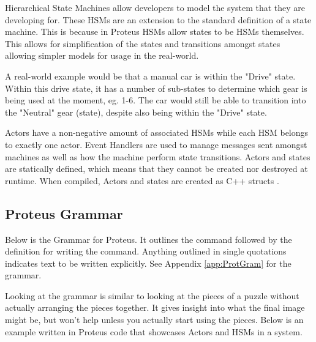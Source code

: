 Hierarchical State Machines allow developers to model the system that they are developing for.
These HSMs are an extension to the standard definition of a state machine.
This is because in Proteus HSMs allow states to be HSMs themselves.
This allows for simplification of the states and transitions amongst states allowing simpler models for usage in the real-world.

A real-world example would be that a manual car is within the "Drive" state.
Within this drive state, it has a number of sub-states to determine which gear is being used at the moment, eg. 1-6.
The car would still be able to transition into the "Neutral" gear (state), despite also being within the "Drive" state.

Actors have a non-negative amount of associated HSMs while each HSM belongs to exactly one actor.
Event Handlers are used to manage messages sent amongst machines as well as how the machine perform state transitions.
Actors and states are statically defined, which means that they cannot be created nor destroyed at runtime.
When compiled, Actors and states are created as C++ structs \cite{ProteusRunTime}.

\subsection{Proteus Grammar}\label{subsec:ProteusGrammar}

Below is the Grammar for Proteus.
It outlines the command followed by the definition for writing the command.
Anything outlined in single quotations indicates text to be written explicitly.
See Appendix \ref{app:ProtGram} for the grammar.

Looking at the grammar is similar to looking at the pieces of a puzzle without actually arranging the pieces together.
It gives insight into what the final image might be, but won't help unless you actually start using the pieces.
Below is an example written in Proteus code that showcases Actors and HSMs in a system.

